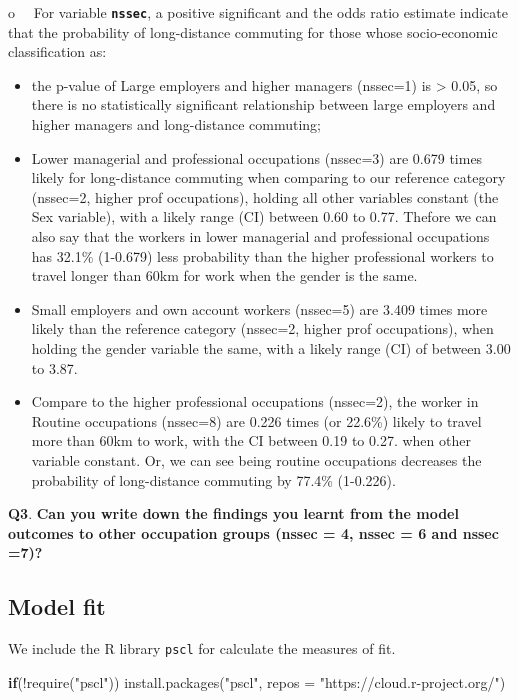 \documentclass[
  letterpaper,
  DIV=11,
  numbers=noendperiod]{scrreprt}
\newenvironment{Shaded}{\begin{snugshade}}{\end{snugshade}}
\newcommand{\AttributeTok}[1]{\textcolor[rgb]{0.40,0.45,0.13}{#1}}
\newcommand{\ControlFlowTok}[1]{\textcolor[rgb]{0.00,0.23,0.31}{\textbf{#1}}}
\newcommand{\FunctionTok}[1]{\textcolor[rgb]{0.28,0.35,0.67}{#1}}
\newcommand{\NormalTok}[1]{\textcolor[rgb]{0.00,0.23,0.31}{#1}}
\newcommand{\SpecialCharTok}[1]{\textcolor[rgb]{0.37,0.37,0.37}{#1}}
\newcommand{\StringTok}[1]{\textcolor[rgb]{0.13,0.47,0.30}{#1}}
\begin{document}
o~~ For variable \textbf{\texttt{nssec}}, a positive significant and the
odds ratio estimate indicate that the probability of long-distance
commuting for those whose socio-economic classification as:

\begin{itemize}
\item
  the p-value of Large employers and higher managers (nssec=1) is
  \textgreater{} 0.05, so there is no statistically significant
  relationship between large employers and higher managers and
  long-distance commuting;
\item
  Lower managerial and professional occupations (nssec=3) are 0.679
  times likely for long-distance commuting when comparing to our
  reference category (nssec=2, higher prof occupations), holding all
  other variables constant (the Sex variable), with a likely range (CI)
  between 0.60 to 0.77. Thefore we can also say that the workers in
  lower managerial and professional occupations has 32.1\% (1-0.679)
  less probability than the higher professional workers to travel longer
  than 60km for work when the gender is the same.
\item
  Small employers and own account workers (nssec=5) are 3.409 times more
  likely than the reference category (nssec=2, higher prof occupations),
  when holding the gender variable the same, with a likely range (CI) of
  between 3.00 to 3.87.
\item
  Compare to the higher professional occupations (nssec=2), the worker
  in Routine occupations (nssec=8) are 0.226 times (or 22.6\%) likely to
  travel more than 60km to work, with the CI between 0.19 to 0.27. when
  other variable constant. Or, we can see being routine occupations
  decreases the probability of long-distance commuting by 77.4\%
  (1-0.226).
\end{itemize}

\textbf{Q3}. \textbf{Can you write down the findings you learnt from the
model outcomes to other occupation groups (nssec = 4, nssec = 6 and
nssec =7)?}

\subsection{\texorpdfstring{\textbf{Model
fit}}{Model fit}}\label{model-fit-1}

We include the R library \texttt{pscl} for calculate the measures of
fit.

\begin{Shaded}
\begin{Highlighting}[]
\ControlFlowTok{if}\NormalTok{(}\SpecialCharTok{!}\FunctionTok{require}\NormalTok{(}\StringTok{"pscl"}\NormalTok{))}
  \FunctionTok{install.packages}\NormalTok{(}\StringTok{"pscl"}\NormalTok{, }\AttributeTok{repos =} \StringTok{"https://cloud.r{-}project.org/"}\NormalTok{)}
\end{Highlighting}
\end{Shaded}
\end{document}
